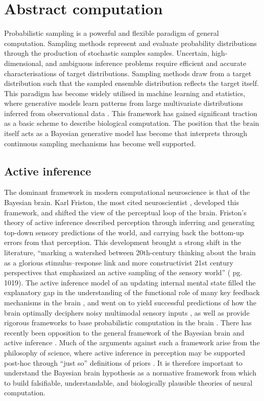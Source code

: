 
\section{Abstract computation}\label{sec:comp_sampling}
Probabilistic sampling is a powerful and flexible paradigm of general computation. Sampling methods represent and evaluate probability distributions through the production of stochastic samples samples. Uncertain, high-dimensional, and ambiguous inference problems require efficient and accurate characterisations of target distributions. Sampling methods draw from a target distribution such that the sampled ensemble distribution reflects the target itself. This paradigm has become widely utilised in machine learning and statistics, where generative models learn patterns from large multivariate distributions inferred from observational data \cite{delacour_neural_1997, cranmer_advances_2023}. This framework has gained significant traction as a basic scheme to describe biological computation. The position that the brain itself acts as a Bayesian generative model has become that interprets through continuous sampling mechanisms has become well supported.
\subsection{Active inference}\label{subsec:active_inf}
The dominant framework in modern computational neuroscience is that of the Bayesian brain. Karl Friston, the most cited neuroscientist \cite{Bohannon2016-kp}, developed this framework, and shifted the view of the perceptual loop of the brain. Friston's theory of active inference described perception through inferring and generating top-down sensory predictions of the world, and carrying back the bottom-up errors from that perception. This development brought a strong shift in the literature, ``marking a watershed between 20th-century thinking about the brain as a glorious stimulus–response link and more constructivist 21st century perspectives that emphasized an active sampling of the sensory world'' (\cite{friston_does_2018} pg. 1019). The active inference model of an updating internal mental state filled the explanatory gap in the understanding of the functional role of many key feedback mechanisms in the brain \cite{rao_predictive_1999, koch_predicting_1999}, and went on to yield successful predictions of how the brain optimally deciphers noisy multimodal sensory inputs \cite{kording_bayesian_2004}, as well as provide rigorous frameworks to base probabilistic computation in the brain \cite{lange_bayesian_2020}. There has recently been opposition to the general framework of the Bayesian brain and active inference \cite{mangalam_myth_2025}. Much of the arguments against such a framework arise from the philosophy of science, where active inference in perception may be supported post-hoc through ``just so'' definitions of priors \cite{mangalam_myth_2025, bowers_bayesian_2012}. It is therefore important to understand the Bayesian brain hypothesis as a normative framework from which to build falsifiable, understandable, and biologically plausible theories of neural computation.

